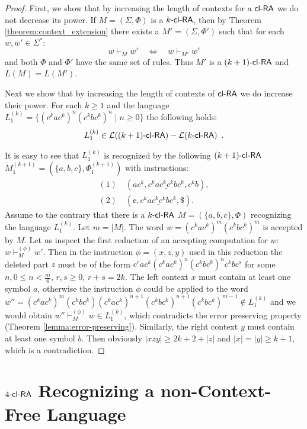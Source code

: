 \begin{proof}
First, we show that by increasing the length of contexts for a $\clRA$ we do not decrease its power. If $M = (\Sigma, \Phi)$ is a $\kclRA$, then by Theorem \ref{theorem:context_extension} there exists a \kCRS[(k+1)] $M' = (\Sigma, \Phi')$ such that for each $w, w' \in \Sigma^*:$
$$w \vdash_M w' \quad \Leftrightarrow \quad w \vdash_{M'} w'$$
and both $\Phi$ and $\Phi'$ have the same set of rules. Thus $M'$ is a $\kclRA[(k+1)]$ and $L(M) = L(M')$.

Next we show that by increasing the length of contexts of $\clRA$ we do increase their power. For each $k\ge 1$ and the language $L_1^{(k)} = \{(c^kac^k)^n(c^kbc^k)^n \mid n \ge 0\}$ the following holds:
$$L_1^{(k)} \in \calL{\kclRA[(k+1)]} - \calL{\kclRA}\enspace.$$

It is easy to see that $L_1^{(k)}$ is recognized by the following $\kclRA[(k+1)]$ $M_1^{(k+1)} = (\{a,b,c\},\Phi_1^{(k+1)})$ with instructions:
$$
\begin{array}{l}
(1) \quad (ac^k, \underline{c^kac^kc^kbc^k}, c^kb),\\
(2) \quad (\cent, \underline{c^kac^kc^kbc^k}, \$).
\end{array}
$$
Assume to the contrary that there is a $\kclRA[k]$ $M=(\{a,b,c\},\Phi)$ recognizing the language $L_1^{(k)}$. Let $m = |M|$. The word $w=(c^kac^k)^m(c^kbc^k)^m$ is accepted by $M$. Let us inspect the first reduction of an accepting computation for $w$: $w \vdash_M^{(\phi)} w'$. Then in the instruction $\phi=(x,z,y)$ used in this reduction the deleted part $z$ must be of the form $c^rac^k(c^kac^k)^n(c^kbc^k)^nc^kbc^s$ for some $n, 0 \le n < \frac{m}{6}$, $r,s \ge 0$, $r+s=2k$. The left context $x$ must contain at least one symbol $a$, otherwise the instruction $\phi$ could be applied to the word $w''=(c^kac^k)^m(c^kbc^k)(c^kac^k)^{n+1}(c^kbc^k)^{n+1}(c^kbc^k)^{m-1} \not\in L_1^{(k)}$ and we would obtain $w'' \vdash_M^{(\phi)} w \in L_1^{(k)}$, which contradicts the error preserving property (Theorem \ref{lemma:error-preserving}). Similarly, the right context $y$ must contain at least one symbol $b$. Then obviously $|xzy| \ge 2k+2 +|z|$ and $|x|=|y| \ge k+1$, which is a contradiction.
\end{proof}

\section[\texorpdfstring{$\kclRA[4]$ Recognizing a non-Context-Free Language}%
                        {4-cl-RA Recognizing a non-CFL}]%
                        {$\kclRA[4]$ Recognizing a non-Context-Free Language}%
\label{4clRA-non-CFL}
\index{$\kclRA[4]$}

